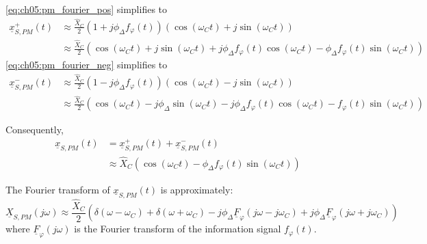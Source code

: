 \begin{refsection}
\eqref{eq:ch05:pm_fourier_pos} simplifies to
\begin{equation}
	\begin{split}
		\underline{x}_{S,PM}^{+}(t) &\approx \frac{\hat{X}_C}{2} \left(1 + j \phi_{\Delta} f_{\varphi}(t)\right) \left(\cos\left(\omega_C t\right) + j \sin\left(\omega_C t\right)\right) \\
		 &\approx \frac{\hat{X}_C}{2} \left(\cos\left(\omega_C t\right) + j \sin\left(\omega_C t\right) + j \phi_{\Delta} f_{\varphi}(t) \cos\left(\omega_C t\right) - \phi_{\Delta} f_{\varphi}(t) \sin\left(\omega_C t\right)\right)
	\end{split}
\end{equation}
\eqref{eq:ch05:pm_fourier_neg} simplifies to
\begin{equation}
	\begin{split}
		\underline{x}_{S,PM}^{-}(t) &\approx \frac{\hat{X}_C}{2} \left(1 - j \phi_{\Delta} f_{\varphi}(t)\right) \left(\cos\left(\omega_C t\right) - j \sin\left(\omega_C t\right)\right) \\
		&\approx \frac{\hat{X}_C}{2} \left(\cos\left(\omega_C t\right) - j \phi_{\Delta} \sin\left(\omega_C t\right) - j \phi_{\Delta} f_{\varphi}(t) \cos\left(\omega_C t\right) - f_{\varphi}(t) \sin\left(\omega_C t\right)\right)
	\end{split}
\end{equation}

Consequently,
\begin{equation}
	\begin{split}
		\underline{x}_{S,PM}(t) &= \underline{x}_{S,PM}^{+}(t) + \underline{x}_{S,PM}^{-}(t) \\
		 &\approx \hat{X}_C \left(\cos\left(\omega_C t\right) - \phi_{\Delta} f_{\varphi}(t) \sin\left(\omega_C t\right)\right)
	\end{split}
\end{equation}

The Fourier transform of $\underline{x}_{S,PM}(t)$ is approximately:
\begin{equation}
	\underline{X}_{S,PM}\left(j\omega\right) \approx \frac{\hat{X}_C}{2} \left( \delta\left(\omega-\omega_C\right) + \delta\left(\omega+\omega_C\right) - j \phi_{\Delta} \underline{F}_{\varphi}\left(j\omega-j\omega_C\right) + j \phi_{\Delta} \underline{F}_{\varphi}\left(j\omega+j\omega_C\right)\right)
\end{equation}
where $\underline{F}_{\varphi}\left(j\omega\right)$ is the Fourier transform of the information signal $f_{\varphi}(t)$.


\end{refsection}
